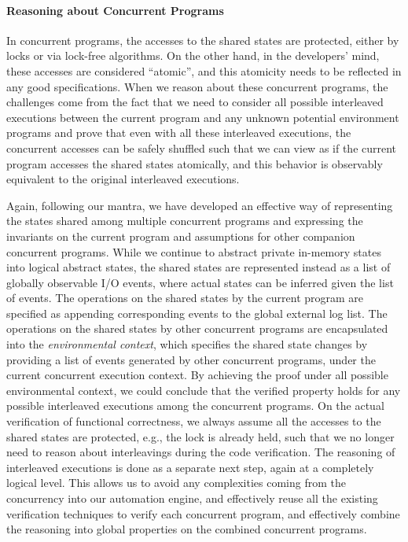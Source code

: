 \paragraph{Reasoning about Concurrent Programs}

In concurrent programs, the accesses to the shared states are protected, either by
locks or via lock-free algorithms. On the other hand, in the developers' mind, these accesses
are considered ``atomic'', and this atomicity needs to be reflected in any good specifications.
When we reason about these concurrent programs, the challenges come from the fact
that we need to consider all possible interleaved executions between the current program
and any unknown potential environment programs and prove that even with all these interleaved
executions, the concurrent accesses can be safely shuffled such that we can view as if
the current program accesses the shared states atomically, and this behavior is observably
equivalent to the original interleaved executions.

Again, following our mantra, we have developed an effective way of representing the states
shared among multiple concurrent programs and expressing the invariants on the current program
and assumptions for other companion concurrent programs. While we continue to abstract private in-memory
states into logical abstract states, the shared states are represented instead as a list of globally
observable I/O events, where actual states can be inferred given the list of events. The operations
on the shared states by the current program are specified as appending corresponding events to the
global external log list. The operations on the shared states by other concurrent programs are encapsulated
into the {\it environmental context}, which specifies the shared state changes by providing a list of events
generated by other concurrent programs, under the current concurrent execution context.
By achieving the proof under all possible environmental context, we could conclude that
the verified property holds for any possible interleaved executions among the concurrent programs.
On the actual verification of functional correctness, we always assume all the accesses to the shared
states are protected, e.g., the lock is already held, such that we no longer need to reason about interleavings
during the code verification. The reasoning of interleaved executions is done as a separate next step,
again at a completely logical level.
This allows us to avoid any complexities coming from the concurrency into our automation engine,
and effectively reuse all the existing
verification techniques to verify each concurrent program, and effectively
combine the reasoning into global properties on the combined concurrent programs.

